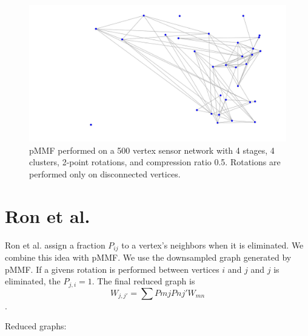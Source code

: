 \documentclass[a4paper]{article}
\begin{document}
\begin{figure}[H]
\includegraphics[width = 7 cm]{disconnected_pMMF/discon_5}

\caption{pMMF performed on a 500 vertex sensor network with 4 stages, 4 clusters, 2-point rotations, and compression ratio 0.5. Rotations are performed only on disconnected vertices.}
\end{figure}

\section{Ron et al.}

Ron et al. assign a fraction $P_{ij}$ to a vertex's neighbors when it is eliminated. We combine this idea with pMMF. We use the downsampled graph generated by pMMF. If a givens rotation is performed between vertices $i$ and $j$ and $j$ is eliminated, the $P_{j, i} = 1$. The final reduced graph is $$W_{j,j'} = \sum P{mj} P{nj'} W_{mn}$$.

Reduced graphs:
\begin{figure}

\end{figure}
\end{document}
